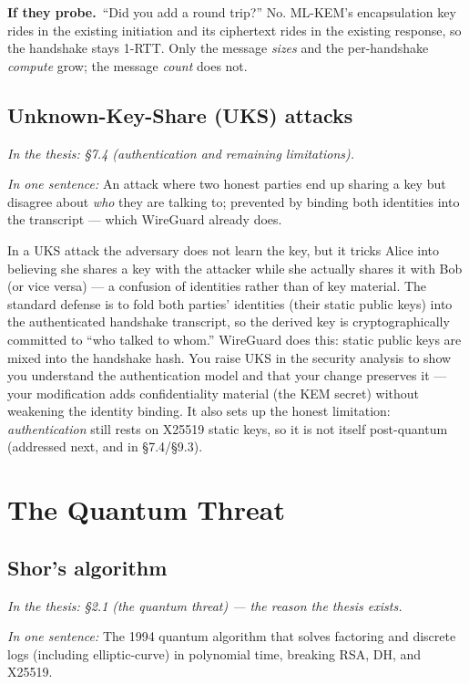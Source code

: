 \documentclass[11pt]{article}
\newcommand{\seethesis}[1]{%
  {\small\color{softgray}\textit{In the thesis: #1}}\par\vspace{3pt}}
\newcommand{\keyq}[1]{%
  \par\vspace{0.4em}%
  \noindent\colorbox{boxbg}{%
    \parbox{\dimexpr\textwidth-2\fboxsep}{%
      \small\textbf{\color{deepcyan}If they probe.}\ #1}}%
  \par\vspace{0.5em}}
\newcommand{\nutshell}[1]{\noindent\textit{In one sentence:} #1\par\vspace{4pt}}
\begin{document}
\keyq{``Did you add a round trip?'' No. ML-KEM's encapsulation key rides in the
existing initiation and its ciphertext rides in the existing response, so the
handshake stays 1-RTT. Only the message \emph{sizes} and the per-handshake
\emph{compute} grow; the message \emph{count} does not.}

\subsection{Unknown-Key-Share (UKS) attacks}
\seethesis{\S7.4 (authentication and remaining limitations).}
\nutshell{An attack where two honest parties end up sharing a key but disagree
about \emph{who} they are talking to; prevented by binding both identities into
the transcript --- which WireGuard already does.}

In a UKS attack the adversary does not learn the key, but it tricks Alice into
believing she shares a key with the attacker while she actually shares it with
Bob (or vice versa) --- a confusion of identities rather than of key material.
The standard defense is to fold both parties' identities (their static public
keys) into the authenticated handshake transcript, so the derived key is
cryptographically committed to ``who talked to whom.'' WireGuard does this: static
public keys are mixed into the handshake hash. You raise UKS in the security
analysis to show you understand the authentication model and that your change
preserves it --- your modification adds confidentiality material (the KEM secret)
without weakening the identity binding. It also sets up the honest limitation:
\emph{authentication} still rests on X25519 static keys, so it is not itself
post-quantum (addressed next, and in \S7.4/\S9.3).

\section{The Quantum Threat}

\subsection{Shor's algorithm}
\seethesis{\S2.1 (the quantum threat) --- the reason the thesis exists.}
\nutshell{The 1994 quantum algorithm that solves factoring and discrete logs
(including elliptic-curve) in polynomial time, breaking RSA, DH, and X25519.}
\end{document}
